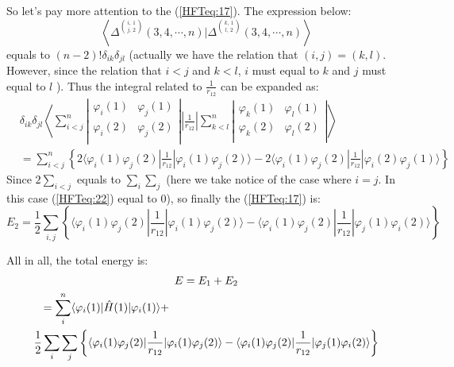 So let's pay more attention to the (\ref{HFTeq:17}). The expression
below:
\begin{equation}\label{}
\left
 \langle
\Delta^{
            i,\,1 \choose
            j,\,2 }
(3,4,\cdots,n) | \Delta^{
            k,\,1 \choose
            l,\,2 }
(3,4,\cdots,n) \right\rangle
\end{equation}
equals to $(n-2)!\delta_{ik}\delta_{jl}$ (actually we have the
relation that $(i, j) = (k, l)$. However, since the relation that
$i< j$ and $k < l$, $i$ must equal to $k$ and $j$ must equal to $l$
). Thus the integral related to $\frac{1}{r_{12}}$ can be expanded as:
\begin{align}\label{HFTeq:22}
&\delta_{ik}\delta_{jl}\left\langle \sum^{n}_{i<j}
 \left|
 \begin{array}{cc}
 \varphi_{i}(1) & \varphi_{j}(1) \\
 \varphi_{i}(2) & \varphi_{j}(2) \\
 \end{array} \right|
 \left |\frac{1}{r_{12}} \right|
 \sum^{n}_{k<l}
  \left|
 \begin{array}{cc}
 \varphi_{k}(1) & \varphi_{l}(1) \\
 \varphi_{k}(2) & \varphi_{l}(2) \\
 \end{array}
 \right|
 \right\rangle \nonumber \\ 
&=\sum_{i<j}^{n} \left \{
2\langle\varphi_{i}(1)\varphi_{j}(2)|\frac{1}{r_{12}}|
\varphi_{i}(1)\varphi_{j}(2)\rangle -
2\langle\varphi_{i}(1)\varphi_{j}(2)|\frac{1}{r_{12}}|
\varphi_{i}(2)\varphi_{j}(1)\rangle
 \right \}
\end{align}
Since $2\sum_{i<j}$ equals to $\sum_{i}\sum_{j}$ (here we take
notice of the case where $i=j$. In this case (\ref{HFTeq:22}) equal
to $0$), so finally the (\ref{HFTeq:17}) is:
\begin{equation}\label{}
E_{2}=\frac{1}{2}\sum_{i,j}\left\{
\langle\varphi_{i}(1)\varphi_{j}(2)|\frac{1}{r_{12}}|\varphi_{i}(1)\varphi_{j}(2)\rangle-
\langle\varphi_{i}(1)\varphi_{j}(2)|\frac{1}{r_{12}}|\varphi_{j}(1)\varphi_{i}(2)\rangle
\right\}
\end{equation}

All in all,  the total energy is:
\begin{multline}\label{HFTeq:6}
  E = E_{1}+E_{2}  \\
    \shoveleft{=\sum_{i}^{n}\langle\varphi_{i}(1)|\hat{H}(1)|\varphi_{i}(1)\rangle
    +}  \\
\frac{1}{2}\sum_{i}\sum_{j} \left\{
\langle\varphi_{i}(1)\varphi_{j}(2)|\frac{1}{r_{12}}|\varphi_{i}(1)\varphi_{j}(2)\rangle-
\langle\varphi_{i}(1)\varphi_{j}(2)|\frac{1}{r_{12}}|\varphi_{j}(1)\varphi_{i}(2)\rangle
\right\}
\end{multline}


